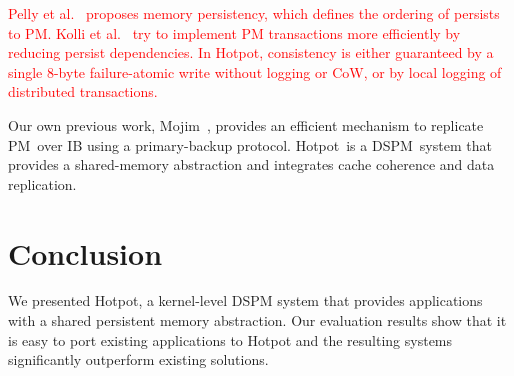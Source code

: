 \documentclass[sigconf]{acmart}
\renewenvironment{thebibliography}[1]{%
    \begin{oldthebibliography}{#1}%
      \setlength{\parskip}{0ex}%
      \setlength{\itemsep}{0ex}%
  }%
  {%
    \end{oldthebibliography}%
  }
\newcommand{\ie}{\textit{i.e.}}
\newcommand{\dsnvm}{DSPM}
\newcommand{\nvm}{PM}
\newcommand{\hotpot}{Hotpot}
\providecommand{\DIFadd}[1]{{\protect\color{blue}\uwave{#1}}} %
\providecommand{\DIFaddbegin}{} %
\providecommand{\DIFaddend}{} %
\providecommand{\DIFdelbegin}{} %
\providecommand{\DIFdelend}{} %
\begin{document}
{
\textcolor{Red}
{
Pelly et al.~\cite{MemoryPersistency} proposes memory persistency, which defines
the ordering of persists to PM. Kolli et al.~\cite{pmxact-asplos16,Delegated-persist}
try to implement PM transactions more efficiently by reducing persist dependencies.
In \hotpot, consistency is either guaranteed by a single 8-byte failure-atomic write without logging or CoW,
or by local logging of distributed transactions.
}
\fi

Our own previous work, Mojim~\cite{Zhang15-Mojim}, provides an efficient mechanism to replicate \nvm\
over IB using a primary-backup protocol.
\hotpot\ is a \dsnvm\ system that provides a shared-memory abstraction
and integrates cache coherence and data replication.

\DIFdelbegin %
\DIFdelend \section{Conclusion}
\label{sec:conclude}
\DIFdelbegin %
\DIFdelend 

We presented \hotpot, a kernel-level DSPM system that provides applications
with a shared persistent memory abstraction. Our evaluation results show that
it is easy to port existing applications to Hotpot and the resulting systems
significantly outperform existing solutions.

\DIFdelbegin %
\DIFdelend \DIFaddbegin \section*{\DIFadd{Acknowledgments}}
\DIFaddend 

}
\end{document}
